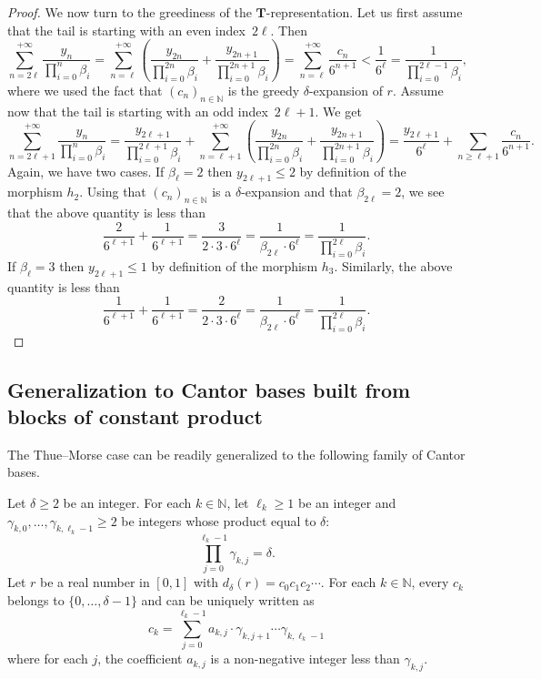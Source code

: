 \documentclass[12pt,reqno]{amsart}
\begin{document}
\begin{proof}
We now turn to the greediness of the $\mathbf{T}$-representation. Let us first assume that the tail is starting with an even index~$2\ell$. Then
\[
    \sum_{n= 2\ell}^{+\infty} \frac{y_n}{\prod_{i=0}^n\beta_i}
    =\sum_{n= \ell}^{+\infty} \left( \frac{y_{2n}}{\prod_{i=0}^{2n}\beta_i}
    +\frac{y_{2n+1}}{\prod_{i=0}^{2n+1}\beta_i}\right)
    =\sum_{n= \ell}^{+\infty} \frac{c_n}{6^{n+1}}
    <\frac{1}{6^{\ell}}
    =\frac{1}{\prod_{i=0}^{2\ell-1} \beta_i},
\]
where we used the fact that $(c_n)_{n\in\mathbb{N}}$ is the greedy $\delta$-expansion of $r$. Assume now that the tail is starting with an odd index~$2\ell+1$. We get
\[
    \sum_{n=2\ell+1}^{+\infty} \frac{y_n}{\prod_{i=0}^n\beta_i}
    =\frac{y_{2\ell+1}}{\prod_{i=0}^{2\ell+1}\beta_i} 
    + \sum_{n=\ell+1}^{+\infty} \left( \frac{y_{2n}}{\prod_{i=0}^{2n}\beta_i}
    +\frac{y_{2n+1}}{\prod_{i=0}^{2n+1}\beta_i}\right)
    =\frac{y_{2\ell+1}}{6^\ell} +\sum_{n\ge \ell+1} \frac{c_n}{6^{n+1}}.
\]
Again, we have two cases. If $\beta_\ell=2$ then 
$y_{2\ell+1}\le 2$ by definition of the morphism $h_2$. Using that $(c_n)_{n\in\mathbb{N}}$ is a $\delta$-expansion and that $\beta_{2\ell}=2$, we see that the above quantity is less than
\[
    \frac{2}{6^{\ell+1}}+\frac{1}{6^{\ell+1}}
    =\frac{3}{2\cdot 3\cdot 6^\ell}=\frac{1}{\beta_{2\ell}\cdot 6^\ell}
    =\frac{1}{\prod_{i=0}^{2\ell}\beta_i}.
\]
If $\beta_\ell=3$ then $y_{2\ell+1}\le 1$ by definition of the morphism $h_3$. Similarly, the above quantity is less than
\[
    \frac{1}{6^{\ell+1}}+\frac{1}{6^{\ell+1}}
    =\frac{2}{2\cdot 3 \cdot 6^\ell}
    =\frac{1}{\beta_{2\ell}\cdot 6^\ell}
    =\frac{1}{\prod_{i=0}^{2\ell}\beta_i}.
\]
\end{proof}

\subsection{Generalization to Cantor bases built from blocks of constant product}

The Thue--Morse case can be readily generalized to the following family of Cantor bases. 

\begin{definition}
\label{def:blocks-delta}
Let $\delta\ge 2$ be an integer. For each $k\in\mathbb{N}$, let $\ell_k\ge 1$ be an integer and $\gamma_{k,0},\ldots,\gamma_{k,\ell_k-1}\ge 2$ be integers whose product equal to $\delta$: 
\begin{equation}
    \label{eq:product-delta}
    \prod_{j=0}^{\ell_k-1}\gamma_{k,j}=\delta.
\end{equation}
Let $r$ be a real number in $[0,1]$ with $d_\delta(r)=c_0c_1c_2\cdots$. 
For each $k\in\mathbb{N}$, every $c_k$ belongs to $\{0,\ldots,\delta-1\}$ and can be uniquely written as
  \begin{equation}
\label{eq:coeff-x_k}    
    c_k=\sum_{j=0}^{\ell_k-1}a_{k,j}\cdot \gamma_{k,j+1}\cdots \gamma_{k,\ell_k-1}
  \end{equation}
  where for each $j$, the coefficient $a_{k,j}$ is a non-negative integer less than $\gamma_{k,j}$. 
\end{definition}
\end{document}
